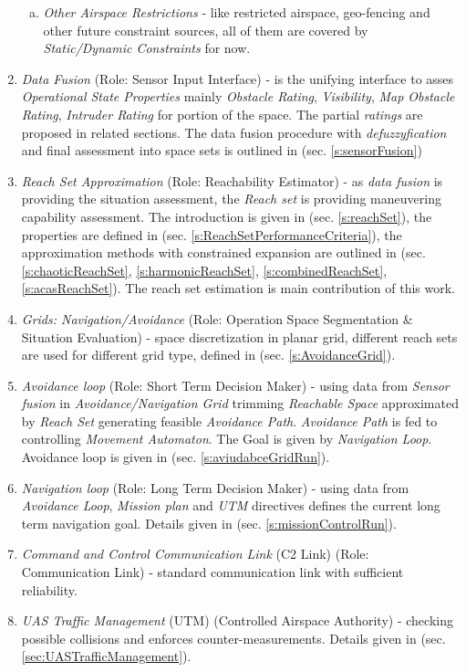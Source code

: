 \begin{enumerate}
\begin{enumerate}[a.]
            \item \emph{Other Airspace Restrictions} - like restricted airspace, geo-fencing and other future constraint sources, all of them are covered by \emph{Static/Dynamic Constraints} for now.
        \end{enumerate}
    
    \item \emph{Data Fusion} (Role: Sensor Input Interface) - is the unifying interface to asses \emph{Operational State Properties} mainly \emph{Obstacle Rating}, \emph{Visibility}, \emph{Map Obstacle Rating}, \emph{Intruder Rating} for portion of the space. The partial \emph{ratings} are proposed in related sections. The data fusion procedure with \emph{defuzzyfication} and final assessment into space sets is outlined in (sec. \ref{s:sensorFusion})  
    
    \item \emph{Reach Set Approximation} (Role: Reachability Estimator) - as \emph{data fusion} is providing the situation assessment, the \emph{Reach set} is providing maneuvering capability assessment. The introduction is given in (sec. \ref{s:reachSet}), the properties are defined in (sec. \ref{s:ReachSetPerformanceCriteria}), the approximation methods with constrained expansion are outlined in (sec. \ref{s:chaoticReachSet}, \ref{s:harmonicReachSet}, \ref{s:combinedReachSet}, \ref{s:acasReachSet}). The reach set estimation is main contribution of this work.
    
    \item \emph{Grids: Navigation/Avoidance} (Role: Operation Space Segmentation \& Situation Evaluation) - space discretization in planar grid, different reach sets are used for different grid type, defined in (sec. \ref{s:AvoidanceGrid}).
    
    \item \emph{Avoidance loop} (Role: Short Term Decision Maker) - using data from \emph{Sensor fusion} in \emph{Avoidance/Navigation Grid} trimming \emph{Reachable Space} approximated by \emph{Reach Set} generating feasible \emph{Avoidance Path}. \emph{Avoidance Path} is fed to controlling \emph{Movement Automaton}. The Goal is given by \emph{Navigation Loop}. Avoidance loop is given in (sec. \ref{s:aviudabceGridRun}).
    
    \item \emph{Navigation loop} (Role: Long Term Decision Maker) - using data from \emph{Avoidance Loop}, \emph{Mission plan} and \emph{UTM} directives defines the current long term navigation goal. Details given in (sec. \ref{s:missionControlRun}).
    
    \item \emph{Command and Control Communication Link} (C2 Link) (Role: Communication Link) - standard communication link with sufficient reliability.
    
    \item \emph{UAS Traffic Management} (UTM) (Controlled Airspace Authority) - checking possible collisions and enforces counter-measurements. Details given in (sec. \ref{sec:UASTrafficManagement}).
    
\end{enumerate}

